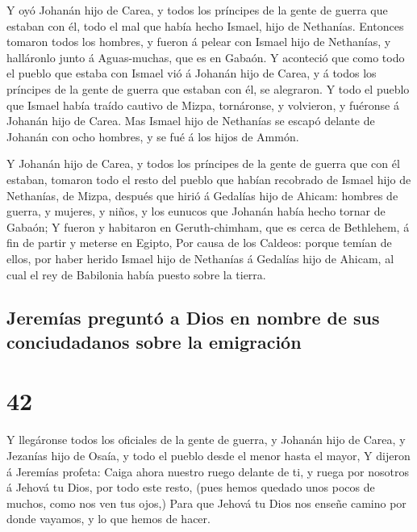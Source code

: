  Y oyó Johanán hijo de Carea, y todos los príncipes de la
gente de guerra que estaban con él, todo el mal que había hecho Ismael,
hijo de Nethanías.  Entonces tomaron todos los hombres, y
fueron á pelear con Ismael hijo de Nethanías, y halláronlo junto á
Aguas-muchas, que es en Gabaón.  Y aconteció que como todo
el pueblo que estaba con Ismael vió á Johanán hijo de Carea, y á todos
los príncipes de la gente de guerra que estaban con él, se alegraron.
 Y todo el pueblo que Ismael había traído cautivo de Mizpa,
tornáronse, y volvieron, y fuéronse á Johanán hijo de Carea.
 Mas Ismael hijo de Nethanías se escapó delante de Johanán
con ocho hombres, y se fué á los hijos de Ammón.

 Y Johanán hijo de Carea, y todos los príncipes de la gente
de guerra que con él estaban, tomaron todo el resto del pueblo que
habían recobrado de Ismael hijo de Nethanías, de Mizpa, después que
hirió á Gedalías hijo de Ahicam: hombres de guerra, y mujeres, y niños,
y los eunucos que Johanán había hecho tornar de Gabaón;  Y
fueron y habitaron en Geruth-chimham, que es cerca de Bethlehem, á fin
de partir y meterse en Egipto,  Por causa de los Caldeos:
porque temían de ellos, por haber herido Ismael hijo de Nethanías á
Gedalías hijo de Ahicam, al cual el rey de Babilonia había puesto sobre
la tierra.

\hypertarget{jeremuxedas-preguntuxf3-a-dios-en-nombre-de-sus-conciudadanos-sobre-la-emigraciuxf3n}{%
\subsection{Jeremías preguntó a Dios en nombre de sus conciudadanos
sobre la
emigración}\label{jeremuxedas-preguntuxf3-a-dios-en-nombre-de-sus-conciudadanos-sobre-la-emigraciuxf3n}}

\hypertarget{section-41}{%
\section{42}\label{section-41}}

 Y llegáronse todos los oficiales de la gente de guerra, y
Johanán hijo de Carea, y Jezanías hijo de Osaía, y todo el pueblo desde
el menor hasta el mayor,  Y dijeron á Jeremías profeta:
Caiga ahora nuestro ruego delante de ti, y ruega por nosotros á Jehová
tu Dios, por todo este resto, (pues hemos quedado unos pocos de muchos,
como nos ven tus ojos,)  Para que Jehová tu Dios nos enseñe
camino por donde vayamos, y lo que hemos de hacer.

